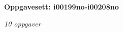 \centerline{\bf Oppgavesett: i00199no-i00208no}
\vskip 10pt
\centerline{\it 10 oppgaver}\vskip 10pt
\vskip 10pt
